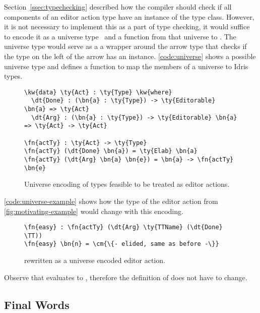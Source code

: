 Section~\ref{ssec:typechecking} described how the compiler should check if all
components of an editor action type have an instance of the \Editorable{} type
class. However, it is not necessary to implement this as a part of type checking,
it would suffice to encode it as a universe type~\cite{genericDep} and a
function from that universe to .
The universe type would serve as a a wrapper around the arrow type that checks
if the type on the left of the arrow has an \Editorable{} instance.
\autoref{code:universe} shows a possible universe type and
defines a function to map the members of a universe to Idris types.

\begin{figure}[H]
\begin{Verbatim}
\kw{data} \ty{Act} : \ty{Type} \kw{where}
  \dt{Done} : (\bn{a} : \ty{Type}) -> \ty{Editorable} \bn{a} => \ty{Act}
  \dt{Arg} : (\bn{a} : \ty{Type}) -> \ty{Editorable} \bn{a} => \ty{Act} -> \ty{Act}

\fn{actTy} : \ty{Act} -> \ty{Type}
\fn{actTy} (\dt{Done} \bn{a}) = \ty{Elab} \bn{a}
\fn{actTy} (\dt{Arg} \bn{a} \bn{e}) = \bn{a} -> \fn{actTy} \bn{e}
\end{Verbatim}
\caption{Universe encoding of types feasible to be treated as editor actions.}
\label{code:universe}
\end{figure}

\autoref{code:universe-example} shows how the type of the  editor
action from \autoref{fig:motivating-example} would change with this encoding.

\begin{figure}[H]
\begin{Verbatim}
\fn{easy} : \fn{actTy} (\dt{Arg} \ty{TTName} (\dt{Done} \TT))
\fn{easy} \bn{n} = \cm{\{- elided, same as before -\}}
\end{Verbatim}
\caption{  rewritten as a universe encoded editor action.}
\label{code:universe-example}
\end{figure}

Observe that  evaluates
to , therefore the definition of  does
not have to change.


\subsection{Final Words}

